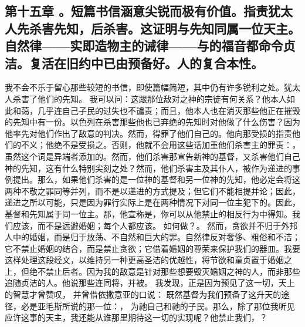 
\subsection{第十五章  。短篇书信涵意尖锐而极有价值。指责犹太人先杀害先知，后杀害。这证明与先知同属一位天主。自然律——实即造物主的诫律——与的福音都命令贞洁。复活在旧约中已由预备好。人的复合本性。}

我不会不乐于留心那些较短的书信，即使篇幅简短，其中仍有许多锐利之处。犹太人杀害了他们的先知。 我可以问：这跟那位敌对之神的宗徒有何关系？他本人如此和蔼，几乎连自己子民的过失也不谴责；而且，他本人也在消灭那些他正在摧毁的先知中有一份。以色列在杀害那些他也已弃绝的先知时对他做了什么伤害？因为他率先对他们作出了敌意的判决。然而，得罪了他们自己的。他向那受损的指责他们的不义；他绝不是受损之。否则，他就不会用这些话加重他们杀害主的罪责：，虽然这个词是异端者添加的。然而，他们杀害那宣告新神的基督，又杀害他们自己神的先知，这有什么特别尖刻之处？然而，他们杀害主及其仆人，被作为递进的事例提出。那么，如果他们杀害的是一位神的基督和另一位神的先知，他必定会将这两种不敬之罪同等并列，而不是以递进的方式提及；但它们不能相提并论；因此，递进之所以可能，只是因为罪行实际上是在两种情况下对同一位主犯下的。因此，基督和先知属于同一位主。那，他宣称是，你可以从他禁止的相反行为中得知。我们应该，而不是远避婚姻；每个人都应该。 如何做？。 然而，贪欲并不归于外邦人中的婚姻，而是归于放荡、不自然和巨大的罪。自然律反对奢侈、粗俗和不洁；它不禁止婚姻的结合，而是禁止贪欲；它借着婚姻的尊荣来保护我们的器皿。我要这样处理这段经文，以维持另一种更高圣洁的优越性，将节欲和童贞置于婚姻之上，但绝不禁止后者。因为我的敌意是针对那些想要毁灭婚姻之神的人，而非那些追随贞洁的人。他说那些连同将，并被。 我发现，正是因为预见了这一切，天上的智慧才曾赞叹， 并曾借依撒意亚的口说： 既然基督为我们预备了这升天的途径，必是亚毛斯所说的那一位：， 为祂自己和祂的子民。那么，除了那位我听见应许这事的天主，我还能从谁那里期待这一切的实现呢？他禁止我们，？ 